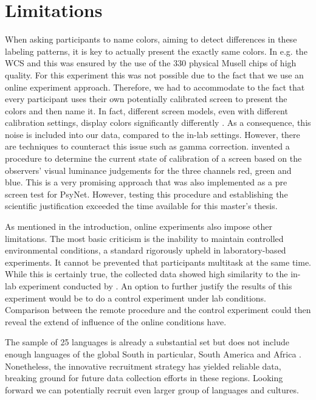 \section{Limitations}

When asking participants to name colors, aiming to detect differences in these labeling patterns, it is key to actually present the exactly same colors. In e.g. the WCS and \textcite{lindseyColor2014} this was ensured by the use of the 330 physical Musell chips of high quality.
For this experiment this was not possible due to the fact that we use an online experiment approach. Therefore, we had to accommodate to the fact that every participant uses their own potentially calibrated screen to present the colors and then name it. In fact, different screen models, even with different calibration settings, display colors significantly differently \parencite{kwak2000characterisation}. As a consequence, this noise is included into our data, compared to the in-lab settings.
However, there are techniques to counteract this issue such as gamma correction. \textcite{xiao2011visual} invented a procedure to determine the current state of calibration of a screen based on the observers’ visual luminance judgements for the three channels red, green and blue. This is a very promising approach that was also implemented as a pre screen test for PsyNet. However, testing this procedure and establishing the scientific justification exceeded the time available for this master's thesis.

As mentioned in the introduction, online experiments also impose other limitations. The most basic criticism is the inability to maintain controlled environmental conditions, a standard rigorously upheld in laboratory-based experiments. It cannot be prevented that participants multitask at the same time. While this is certainly true, the collected data showed high similarity to the in-lab experiment conducted by \textcite{lindseyColor2014}. An option to further justify the results of this experiment would be to do a control experiment under lab conditions. Comparison between the remote procedure and the control experiment could then reveal the extend of influence of the online conditions have.

The sample of 25 languages is already a substantial set but does not include enough languages of the global South in particular, South America and Africa \parencite{barrett2020towards, blasi2022over}. Nonetheless, the innovative recruitment strategy has yielded reliable data, breaking ground for future data collection efforts in these regions. Looking forward we can potentially recruit even larger group of languages and cultures.

